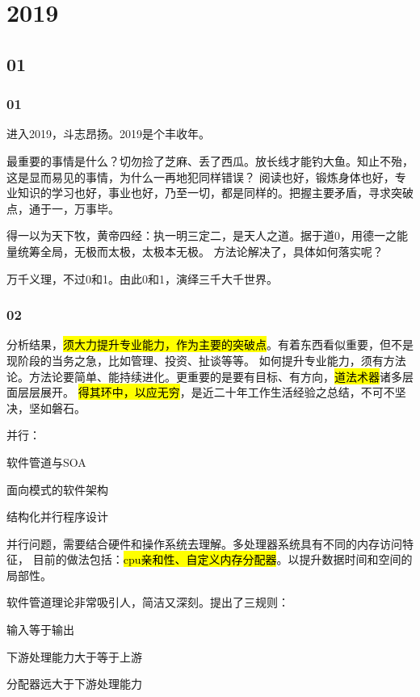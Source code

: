 \chapter{2019}

\section{01}

\subsection{01}

进入2019，斗志昂扬。2019是个丰收年。

最重要的事情是什么？切勿捡了芝麻、丢了西瓜。放长线才能钓大鱼。知止不殆，这是显而易见的事情，为什么一再地犯同样错误？
阅读也好，锻炼身体也好，专业知识的学习也好，事业也好，乃至一切，都是同样的。把握主要矛盾，寻求突破点，通于一，万事毕。

得一以为天下牧，黄帝四经：执一明三定二，是天人之道。据于道0，用德一之能量统筹全局，无极而太极，太极本无极。
方法论解决了，具体如何落实呢？

万千义理，不过0和1。由此0和1，演绎三千大千世界。

\subsection{02}

分析结果，\hl{须大力提升专业能力，作为主要的突破点}。有着东西看似重要，但不是现阶段的当务之急，比如管理、投资、扯谈等等。
如何提升专业能力，须有方法论。方法论要简单、能持续进化。更重要的是要有目标、有方向，\hl{道法术器}诸多层面层层展开。
\hl{得其环中，以应无穷}，是近二十年工作生活经验之总结，不可不坚决，坚如磐石。

并行：
\begin{enumbox}
\item 软件管道与SOA
\item 面向模式的软件架构
\item 结构化并行程序设计
\end{enumbox}

并行问题，需要结合硬件和操作系统去理解。多处理器系统具有不同的内存访问特征，
目前的做法包括：\hl{cpu亲和性、自定义内存分配器}。以提升数据时间和空间的局部性。

软件管道理论非常吸引人，简洁又深刻。提出了三规则：
\begin{enumbox}
\item 输入等于输出
\item 下游处理能力大于等于上游
\item 分配器远大于下游处理能力
\end{enumbox}

